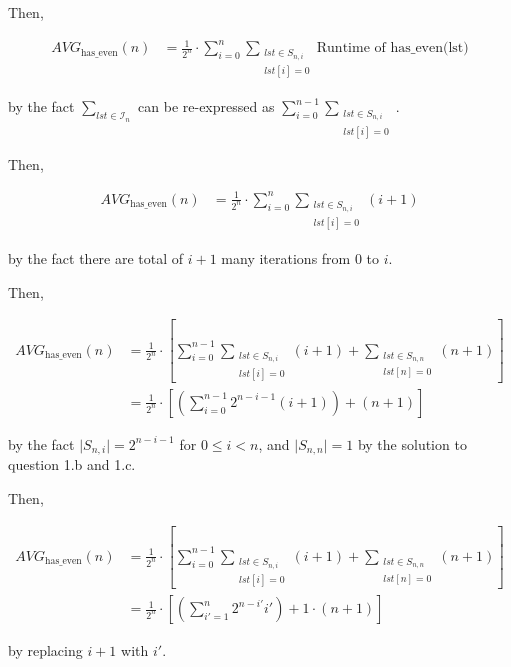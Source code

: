 \documentclass[12pt]{article}
\begin{document}
\begin{enumerate}[a.]
\begin{mdframed}
        \bigskip

        \color{red}
        Then,

        \begin{align}
            AVG_{\text{has\_even}}(n) &= \frac{1}{2^n} \cdot \sum\limits_{i=0}^n \sum\limits_{\substack{lst \in S_{n,i}\\ lst[i]=0}} \text{Runtime of has\_even(lst)}
        \end{align}

        by the fact $\sum\limits_{lst \in \mathcal{I}_n}$ can be re-expressed as $\sum\limits_{i=0}^{n-1} \sum\limits_{\substack{lst \in S_{n,i}\\ lst[i]=0}}$.

        \bigskip

        Then,

        \begin{align}
            AVG_{\text{has\_even}}(n) &= \frac{1}{2^n} \cdot \sum\limits_{i=0}^n \sum\limits_{\substack{lst \in S_{n,i}\\ lst[i]=0}} (i+1)
        \end{align}

        by the fact there are total of $i+1$ many iterations from $0$ to $i$.

        \bigskip

        Then,

        \begin{align}
            AVG_{\text{has\_even}}(n) &= \frac{1}{2^n} \cdot \left[ \sum\limits_{i=0}^{n-1} \sum\limits_{\substack{lst \in S_{n,i}\\ lst[i]=0}} (i+1) +  \sum\limits_{\substack{lst \in S_{n,n}\\ lst[n]=0}} (n+1) \right]\\
            &= \frac{1}{2^n} \cdot \left[ \left(\sum\limits_{i=0}^{n-1} 2^{n-i-1} (i+1) \right) + (n+1) \right]
        \end{align}

        by the fact $\lvert S_{n,i} \rvert = 2^{n-i-1}$ for $0 \leq i < n$, and $\lvert S_{n,n} \rvert = 1$
        by the solution to question 1.b and 1.c.

        \bigskip

        Then,

        \begin{align}
            AVG_{\text{has\_even}}(n) &= \frac{1}{2^n} \cdot \left[ \sum\limits_{i=0}^{n-1} \sum\limits_{\substack{lst \in S_{n,i}\\ lst[i]=0}} (i+1) +  \sum\limits_{\substack{lst \in S_{n,n}\\ lst[n]=0}} (n+1) \right]\\
            &= \frac{1}{2^n} \cdot \left[ \left(\sum\limits_{i'=1}^n 2^{n-i'} i' \right) +  1 \cdot (n+1) \right]
        \end{align}

        by replacing $i + 1$ with $i'$.

        \color{black}

    \end{mdframed}

\end{enumerate}
\end{document}
